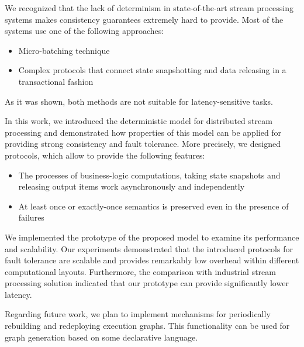 
\label {fs-conclusion-seciton}

We recognized that the lack of determinism in state-of-the-art stream processing systems makes consistency guarantees extremely hard to provide. Most of the systems use one of the following approaches: 
\begin{itemize}
    \item Micro-batching technique
    \item Complex protocols that connect state snapshotting and data releasing in a transactional fashion
\end{itemize}

As it was shown, both methods are not suitable for latency-sensitive tasks. 

In this work, we introduced the deterministic model for distributed stream processing and demonstrated how properties of this model can be applied for providing strong consistency and fault tolerance. More precisely, we designed protocols, which allow to provide the following features:

\begin{itemize}
    \item The processes of business-logic computations, taking state snapshots and releasing output items work asynchronously and independently
    \item At least once or exactly-once semantics is preserved even in the presence of failures
\end{itemize}

We implemented the prototype of the proposed model to examine its performance and scalability. Our experiments demonstrated that the introduced protocols for fault tolerance are scalable and provides remarkably low overhead within different computational layouts. Furthermore, the comparison with industrial stream processing solution indicated that our prototype can provide significantly lower latency.

Regarding future work, we plan to implement mechanisms for periodically rebuilding and redeploying execution graphs. This functionality can be used for graph generation based on some declarative language.